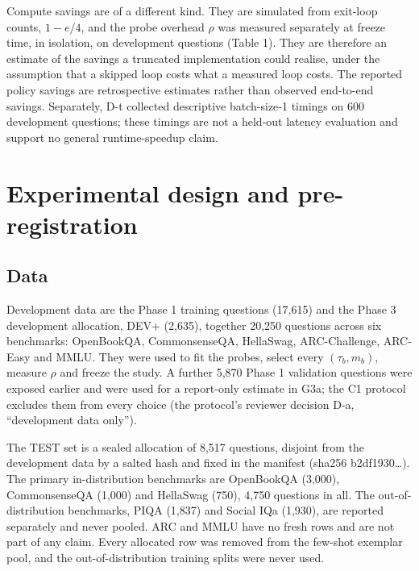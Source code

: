 Compute savings are of a different kind. They are simulated from exit-loop counts, \(1 - e/4\), and the probe overhead \(\rho\) was measured separately at freeze time, in isolation, on development questions (Table 1). They are therefore an estimate of the savings a truncated implementation could realise, under the assumption that a skipped loop costs what a measured loop costs. The reported policy savings are retrospective estimates rather than observed end-to-end savings. Separately, D-t collected descriptive batch-size-1 timings on 600 development questions; these timings are not a held-out latency evaluation and support no general runtime-speedup claim.

\section{Experimental design and pre-registration}

\subsection{Data}

Development data are the Phase 1 training questions (17,615) and the Phase 3 development allocation, DEV+ (2,635), together 20,250 questions across six benchmarks: OpenBookQA, CommonsenseQA, HellaSwag, ARC-Challenge, ARC-Easy and MMLU. They were used to fit the probes, select every \((\tau_b, m_b)\), measure \(\rho\) and freeze the study. A further 5,870 Phase 1 validation questions were exposed earlier and were used for a report-only estimate in G3a; the C1 protocol excludes them from every choice (the protocol's reviewer decision D-a, ``development data only'').

The TEST set is a sealed allocation of 8,517 questions, disjoint from the development data by a salted hash and fixed in the manifest (sha256 b2df1930\ldots). The primary in-distribution benchmarks are OpenBookQA (3,000), CommonsenseQA (1,000) and HellaSwag (750), 4,750 questions in all. The out-of-distribution benchmarks, PIQA (1,837) and Social IQa (1,930), are reported separately and never pooled. ARC and MMLU have no fresh rows and are not part of any claim. Every allocated row was removed from the few-shot exemplar pool, and the out-of-distribution training splits were never used.

